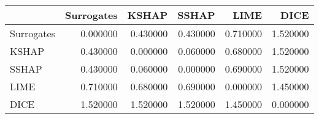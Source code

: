 \begin{tabular}{lrrrrr}
\toprule
 & Surrogates & KSHAP & SSHAP & LIME & DICE \\
\midrule
Surrogates & 0.000000 & 0.430000 & 0.430000 & 0.710000 & 1.520000 \\
KSHAP & 0.430000 & 0.000000 & 0.060000 & 0.680000 & 1.520000 \\
SSHAP & 0.430000 & 0.060000 & 0.000000 & 0.690000 & 1.520000 \\
LIME & 0.710000 & 0.680000 & 0.690000 & 0.000000 & 1.450000 \\
DICE & 1.520000 & 1.520000 & 1.520000 & 1.450000 & 0.000000 \\
\bottomrule
\end{tabular}
